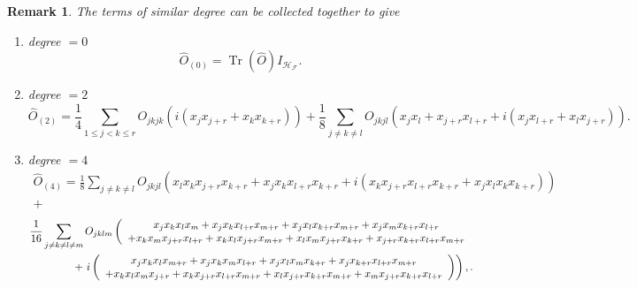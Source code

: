 \documentclass[aps,preprint]{revtex4}%
\newtheorem{remark}[theorem]{Remark}
\begin{document}
\begin{remark}
The terms of similar degree can be collected together to give

\begin{enumerate}
\item degree $=0$%
\begin{equation}
\hat{O}_{\left(  0\right)  }=\operatorname*{Tr}\left(  \hat{O}\right)
I_{\mathcal{H}_{\mathcal{F}}}.
\end{equation}


\item degree $=2$%
\begin{equation}
\hat{O}_{\left(  2\right)  }=\frac{1}{4}\sum_{1\leq j<k\leq r}O_{jkjk}\left(
\overset{}{i\left(  x_{j}x_{j+r}+x_{k}x_{k+r}\right)  }\right)  +\frac{1}%
{8}\sum_{j\neq k\neq l}O_{jkjl}\left(  \overset{}{x_{j}x_{l}+x_{j+r}%
x_{l+r}+i\left(  x_{j}x_{l+r}+x_{l}x_{j+r}\right)  }\right)  .
\end{equation}


\item degree $=4$%
\begin{gather}
\hat{O}_{\left(  4\right)  }=\frac{1}{8}\sum_{j\neq k\neq l}O_{jkjl}\left(
\overset{}{x_{l}x_{k}x_{j+r}x_{k+r}+x_{j}x_{k}x_{l+r}x_{k+r}+i\left(
x_{k}x_{j+r}x_{l+r}x_{k+r}+x_{j}x_{l}x_{k}x_{k+r}\right)  }\right) \\
+
\end{gather}%
\begin{align}
&  \frac{1}{16}\sum_{j\neq k\neq l\neq m}O_{jklm}\left(
\begin{array}
[c]{c}%
\overset{}{x_{j}x_{k}x_{l}x_{m}+x_{j}x_{k}x_{l+r}x_{m+r}+x_{j}x_{l}%
x_{k+r}x_{m+r}+x_{j}x_{m}x_{k+r}x_{l+r}}\\
+\overset{}{x_{k}x_{m}x_{j+r}x_{l+r}+x_{k}x_{l}x_{j+r}x_{m+r}+x_{l}%
x_{m}x_{j+r}x_{k+r}+x_{j+r}x_{k+r}x_{l+r}x_{m+r}}%
\end{array}
\right. \\
&  \qquad\quad\quad+\left.  i\left(
\begin{array}
[c]{c}%
\overset{}{x_{j}x_{k}x_{l}x_{m+r}+x_{j}x_{k}x_{m}x_{l+r}+x_{j}x_{l}%
x_{m}x_{k+r}+x_{j}x_{k+r}x_{l+r}x_{m+r}}\\
+\overset{}{x_{k}x_{l}x_{m}x_{j+r}+x_{k}x_{j+r}x_{l+r}x_{m+r}+x_{l}%
x_{j+r}x_{k+r}x_{m+r}+x_{m}x_{j+r}x_{k+r}x_{l+r}}%
\end{array}
\right)  \right)  ,.
\end{align}

\end{enumerate}
\end{remark}
\end{document}
